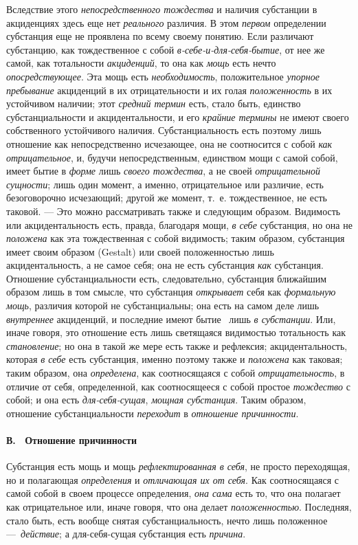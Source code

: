Вследствие этого {\em непосредственного тождества} и
наличия субстанции в акциденциях здесь еще нет
{\em реального} различия. В этом
{\em первом} определении субстанция еще не проявлена по
всему своему понятию. Если различают субстанцию, как тождественное с собой
{\em в-себе-и-для-себя-бытие}, от нее же самой, как
тотальности {\em акциденций}, то она как
{\em мощь} есть нечто
{\em опосредствующее}. Эта мощь есть
{\em необходимость}, положительное
{\em упорное пребывание} акциденций в их
отрицательности и их голая {\em положенность} в их
устойчивом наличии; этот {\em средний термин} есть,
стало быть, единство субстанциальности и акцидентальности, и его
{\em крайние термины} не имеют своего собственного
устойчивого наличия. Субстанциальность есть поэтому лишь отношение как
непосредственно исчезающее, она не соотносится с собой
{\em как отрицательное}, и, будучи непосредственным,
единством мощи с самой собой, имеет бытие в {\em форме}
лишь {\em своего тождества}, а не своей
{\em отрицательной сущности}; лишь один момент, а
именно, отрицательное или различие, есть безоговорочно исчезающий; другой
же момент, т.~е. тождественное, не есть таковой. — Это можно рассматривать
также и следующим образом. Видимость или акцидентальность есть, правда,
благодаря мощи, {\em в себе} субстанция, но она не
{\em положена} как эта тождественная с собой видимость;
таким образом, субстанция имеет своим образом (Gestalt) или своей
положенностью лишь акцидентальность, а не самое себя; она не есть
субстанция {\em как} субстанция. Отношение
субстанциальности есть, следовательно, субстанция ближайшим образом лишь в
том смысле, что субстанция {\em открывает} себя как
{\em формальную мощь}, различия которой не
субстанциальны; она есть на самом деле лишь
{\em внутреннее} акциденций, и последние имеют бытие
\ лишь {\em в субстанции}. Или, иначе говоря, это
отношение есть лишь светящаяся видимостью тотальность как
{\em становление}; но она в такой же мере есть также и
рефлексия; акцидентальность, которая {\em в себе} есть
субстанция, именно поэтому также и {\em положена} как
таковая; таким образом, она {\em определена}, как
соотносящаяся с собой {\em отрицательность}, в отличие
от себя, определенной, как соотносящееся с собой простое
{\em тождество} с собой; и она есть
{\em для-себя-сущая}, {\em мощная
субстанция}. Таким образом, отношение субстанциальности
{\em переходит} в {\em отношение
причинности}.

\paragraph[В. \ Отношение причинности]{В. \ Отношение причинности}
Субстанция есть мощь и мощь
{\em рефлектированная в себя}, не просто переходящая,
но и полагающая {\em определения} и
{\em отличающая их от себя}. Как соотносящаяся с самой
собой в своем процессе определения, {\em она сама} есть
то, что она полагает как отрицательное или, иначе говоря, что она делает
{\em положенностью}. Последняя, стало быть, есть вообще
снятая субстанциальность, нечто лишь положенное
—~{\em действие}; а для-себя-сущая субстанция есть
{\em причина}.


